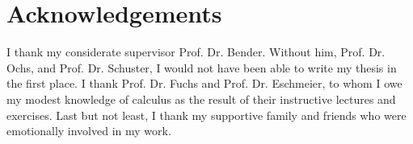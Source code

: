 \chapter*{Acknowledgements}

I thank my considerate supervisor Prof. Dr. Bender. Without him, Prof. Dr. Ochs, and Prof. Dr. Schuster, I would not have been able to write my thesis in the first place. I thank Prof. Dr. Fuchs and Prof. Dr. Eschmeier, to whom I owe my modest knowledge of calculus as the result of their instructive lectures and exercises. Last but not least, I thank my supportive family and friends who were emotionally involved in my work.
